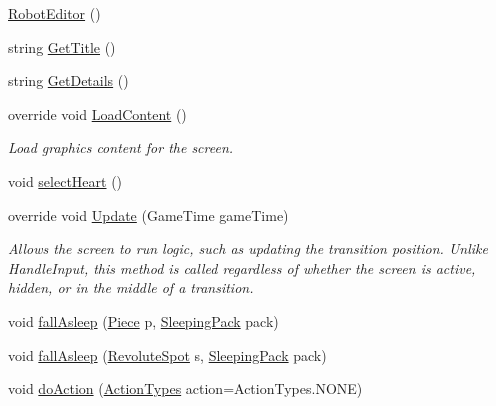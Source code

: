 \begin{DoxyCompactItemize}
\item 
\hyperlink{classgearit_1_1src_1_1editor_1_1robot_1_1_robot_editor_a70d97b5b6924414d39f090011a313c96}{Robot\+Editor} ()
\item 
string \hyperlink{classgearit_1_1src_1_1editor_1_1robot_1_1_robot_editor_ab4497e4546c0c7b86bc9e75282a284a9}{Get\+Title} ()
\item 
string \hyperlink{classgearit_1_1src_1_1editor_1_1robot_1_1_robot_editor_a6bd5e6a720659a1f46f2ce794eef696f}{Get\+Details} ()
\item 
override void \hyperlink{classgearit_1_1src_1_1editor_1_1robot_1_1_robot_editor_ad1a5b0cb964d9cb01ad724c6e0311f5d}{Load\+Content} ()
\begin{DoxyCompactList}\small\item\em Load graphics content for the screen. \end{DoxyCompactList}\item 
void \hyperlink{classgearit_1_1src_1_1editor_1_1robot_1_1_robot_editor_aa7e35ba6cff55fdf1268fef0c18eafcf}{select\+Heart} ()
\item 
override void \hyperlink{classgearit_1_1src_1_1editor_1_1robot_1_1_robot_editor_aeabcb08f49a3ef48d61f3856baf7e7b6}{Update} (Game\+Time game\+Time)
\begin{DoxyCompactList}\small\item\em Allows the screen to run logic, such as updating the transition position. Unlike Handle\+Input, this method is called regardless of whether the screen is active, hidden, or in the middle of a transition. \end{DoxyCompactList}\item 
void \hyperlink{classgearit_1_1src_1_1editor_1_1robot_1_1_robot_editor_a7df648227d3cc56e4c986f2843f54e6f}{fall\+Asleep} (\hyperlink{classgearit_1_1src_1_1robot_1_1_piece}{Piece} p, \hyperlink{classgearit_1_1src_1_1robot_1_1_sleeping_pack}{Sleeping\+Pack} pack)
\item 
void \hyperlink{classgearit_1_1src_1_1editor_1_1robot_1_1_robot_editor_aa6a2d15e57a86e93d571e0d2ab908240}{fall\+Asleep} (\hyperlink{classgearit_1_1src_1_1robot_1_1_revolute_spot}{Revolute\+Spot} s, \hyperlink{classgearit_1_1src_1_1robot_1_1_sleeping_pack}{Sleeping\+Pack} pack)
\item 
void \hyperlink{classgearit_1_1src_1_1editor_1_1robot_1_1_robot_editor_aac2819fbdea304cb5c2b59d880c15a20}{do\+Action} (\hyperlink{namespacegearit_1_1src_1_1editor_1_1robot_1_1action_a4be0fd46e3952d6135136b20e7b3fc5e}{Action\+Types} action=Action\+Types.\+N\+O\+N\+E)

\end{DoxyCompactItemize}
